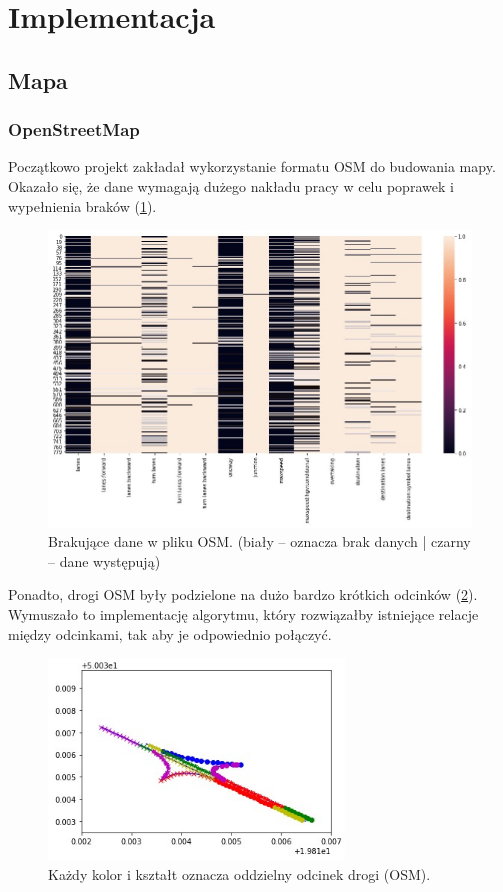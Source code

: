 \documentclass[a4paper,12pt]{article}
\begin{document}
    \section{Implementacja}
    
    \subsection{Mapa}
    \subsubsection{OpenStreetMap}
    Początkowo projekt zakładał wykorzystanie formatu OSM do budowania mapy. Okazało się, że dane wymagają dużego nakładu pracy w celu poprawek i wypełnienia braków (\ref{osm-na}).
    
    \begin{figure}[H]
    	\centering
    	\includegraphics[width=\textwidth]{img/whiteisna.jpg}
    	\caption{Brakujące dane w pliku OSM. (biały -- oznacza brak danych | czarny -- dane występują)}
    	\label{osm-na}
    \end{figure}
    
    Ponadto, drogi OSM były podzielone na dużo bardzo krótkich odcinków (\ref{osm-parts}). Wymuszało to implementację algorytmu, który rozwiązałby istniejące relacje między odcinkami, tak aby je odpowiednio połączyć.
    
    \begin{figure}[H]
    	\centering
    	\includegraphics[width=0.7\textwidth]{img/osmparts.jpg}
    	\caption{Każdy kolor i kształt oznacza oddzielny odcinek drogi (OSM).}
    	\label{osm-parts}
    \end{figure}
    
\end{document}
